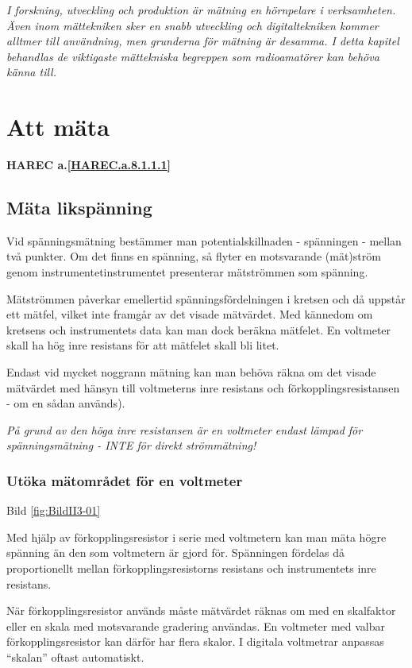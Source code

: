 \emph{I forskning, utveckling och produktion är mätning en hörnpelare
  i verksamheten. Även inom mättekniken sker en snabb utveckling och
  digitaltekniken kommer alltmer till användning, men grunderna för
  mätning är desamma. I detta kapitel behandlas de viktigaste
  mättekniska begreppen som radioamatörer kan behöva känna till.}

\section{Att mäta}
\textbf{
HAREC a.\ref{HAREC.a.8.1.1.1}\label{myHAREC.a.8.1.1.1}
}

\subsection{Mäta likspänning}

Vid spänningsmätning bestämmer man potentialskillnaden - spänningen -
mellan två punkter. Om det finns en spänning, så flyter en motsvarande
(mät)ström genom instrumentetinstrumentet presenterar mätströmmen som
spänning.

Mätströmmen påverkar emellertid spänningsfördelningen i kretsen och då
uppstår ett mätfel, vilket inte framgår av det visade mätvärdet. Med
kännedom om kretsens och instrumentets data kan man dock beräkna
mätfelet. En voltmeter skall ha hög inre resistans för att mätfelet
skall bli litet.

Endast vid mycket noggrann mätning kan man behöva räkna om det visade
mätvärdet med hänsyn till voltmeterns inre resistans och
förkopplingsresistansen - om en sådan används).

\emph{På grund av den höga inre resistansen är en voltmeter endast
  lämpad för spänningsmätning - INTE för direkt strömmätning!}

\subsubsection{Utöka mätområdet för en voltmeter}

Bild \ref{fig:BildII3-01}

Med hjälp av förkopplingsresistor i serie med voltmetern kan man mäta
högre spänning än den som voltmetern är gjord för.  Spänningen
fördelas då proportionellt mellan förkopplingsresistorns resistans och
instrumentets inre resistans.

När förkopplingsresistor används måste mätvärdet räknas om med en
skalfaktor eller en skala med motsvarande gradering användas. En
voltmeter med valbar förkopplingsresistor kan därför har flera
skalor. I digitala voltmetrar anpassas ``skalan'' oftast automatiskt.

